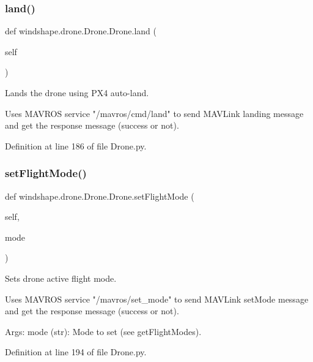 \subsubsection{\texorpdfstring{land()}{land()}}
{\footnotesize\ttfamily def windshape.\+drone.\+Drone.\+Drone.\+land (\begin{DoxyParamCaption}\item[{}]{self }\end{DoxyParamCaption})}

\begin{DoxyVerb}Lands the drone using PX4 auto-land.

Uses MAVROS service "/mavros/cmd/land" to send MAVLink landing
message and get the response message (success or not).
\end{DoxyVerb}
 

Definition at line 186 of file Drone.\+py.

\mbox{\label{classwindshape_1_1drone_1_1_drone_1_1_drone_a728b7ccd51bc67e1338652940f24caac}} 
\subsubsection{\texorpdfstring{set\+Flight\+Mode()}{setFlightMode()}}
{\footnotesize\ttfamily def windshape.\+drone.\+Drone.\+Drone.\+set\+Flight\+Mode (\begin{DoxyParamCaption}\item[{}]{self,  }\item[{}]{mode }\end{DoxyParamCaption})}

\begin{DoxyVerb}Sets drone active flight mode.

Uses MAVROS service "/mavros/set_mode" to send MAVLink setMode
message and get the response message (success or not).

Args:
    mode (str): Mode to set (see getFlightModes).
\end{DoxyVerb}
 

Definition at line 194 of file Drone.\+py.

\mbox{\label{classwindshape_1_1drone_1_1_drone_1_1_drone_a56218cb96a8907668ec8137085fb41e7}} 

